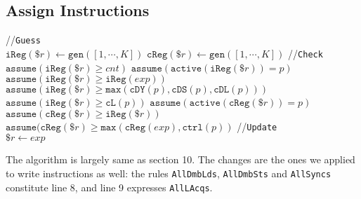 \documentclass{article}
\newcommand{\var}{\texttt}
\begin{document}
\subsection{Assign Instructions}
\begin{algorithm}[H]
  \SetAlgoLined
  //\var{Guess}\\
  $\var{iReg}(\$r) \gets \var{gen}([1,\cdots,K])$\;
  $\var{cReg}(\$r) \gets \var{gen}([1,\cdots,K])$\;
  //\var{Check}\\
  $\var{assume}(\var{iReg}(\$r) \geq cnt)$\;
  $\var{assume}(\var{active}(\var{iReg}(\$r)) = p)$\;
  $\var{assume}(\var{iReg}(\$r) \geq \var{iReg}(exp))$\;
  $\var{assume}(\var{iReg}(\$r) \geq \var{max}(\var{cDY}(p),\var{cDS}(p),\var{cDL}(p)))$\;
  $\var{assume}(\var{iReg}(\$r) \geq \var{cL}(p))$\;
  $\var{assume}(\var{active}(\var{cReg}(\$r)) = p)$\;
  $\var{assume}(\var{cReg}(\$r) \geq \var{iReg}(\$r))$\;
  $\var{assume}(\var{cReg}(\$r) \geq \var{max}(\var{cReg}(exp),\var{ctrl}(p))$\;
  //\var{Update}\\
  $\$r \gets exp$\;
  \caption{$\llbracket \$r \leftarrow exp\rrbracket_K^{p,\var{Assign}}$}
\end{algorithm}
The algorithm is largely same as section 10. The changes are the ones we applied to write instructions as well: the rules \var{AllDmbLds}, \var{AllDmbSts} and \var{AllSyncs} constitute line 8, and line 9 expresses \var{AllLAcqs}.
\end{document}
